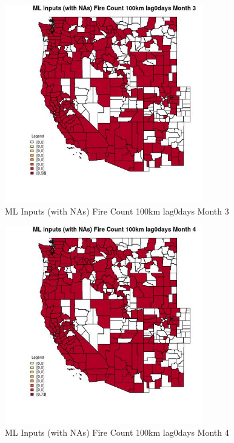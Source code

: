 \begin{figure} 
\centering  
\includegraphics[width=0.77\textwidth]{Code_Outputs/Report_ML_input_PM25_Step4_part_e_de_duplicated_aves_compiled_2019-05-20wNAs_CountyFire_Count_100km_lag0daysmedianMonth3.jpg} 
\caption{\label{fig:Report_ML_input_PM25_Step4_part_e_de_duplicated_aves_compiled_2019-05-20wNAsCountyFire_Count_100km_lag0daysmedianMonth3}ML Inputs (with NAs) Fire Count 100km lag0days Month 3} 
\end{figure} 
 

\begin{figure} 
\centering  
\includegraphics[width=0.77\textwidth]{Code_Outputs/Report_ML_input_PM25_Step4_part_e_de_duplicated_aves_compiled_2019-05-20wNAs_CountyFire_Count_100km_lag0daysmedianMonth4.jpg} 
\caption{\label{fig:Report_ML_input_PM25_Step4_part_e_de_duplicated_aves_compiled_2019-05-20wNAsCountyFire_Count_100km_lag0daysmedianMonth4}ML Inputs (with NAs) Fire Count 100km lag0days Month 4} 
\end{figure} 
 

